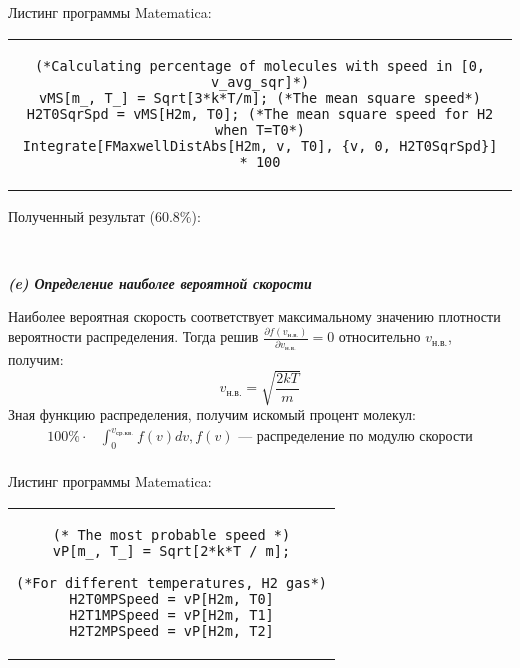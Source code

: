 Листинг программы Matematica:
\begin{center}
    \begin{tabular}{c}
    \begin{lstlisting}
(*Calculating percentage of molecules with speed in [0, v_avg_sqr]*)
vMS[m_, T_] = Sqrt[3*k*T/m]; (*The mean square speed*)
H2T0SqrSpd = vMS[H2m, T0]; (*The mean square speed for H2 when T=T0*)
Integrate[FMaxwellDistAbs[H2m, v, T0], {v, 0, H2T0SqrSpd}] * 100
    \end{lstlisting}
    \end{tabular}
\end{center}

Полученный результат (60.8\%):
\hspace{0pt}
\begin{figure}[H]
    \centering
    \begin{minipage}[h]{0.2\linewidth}
        \\
    \end{minipage}
\end{figure}


\textit{\textbf{(e) Определение наиболее вероятной скорости}}

Наиболее вероятная скорость соответствует максимальному значению плотности вероятности распределения.
Тогда решив $\frac{\partial f(v_{\text{н.в.}}) }{\partial v_{\text{н.в.}}} = 0$ относительно $v_{\text{н.в.}}$, получим:
\begin{equation*}
    v_{\text{н.в.}} = \sqrt{\frac{2kT}{m}}
\end{equation*}
Зная функцию распределения, получим искомый процент молекул:
\begin{equation*}
    \begin{aligned}
        100\% \cdot &\int_{0}^{v_{\text{ср.кв.}}} f(v)dv, f(v) \text{ --- распределение по модулю скорости}\\
    \end{aligned}
\end{equation*}

Листинг программы Matematica:
\begin{center}
    \begin{tabular}{c}
    \begin{lstlisting}
(* The most probable speed *)
vP[m_, T_] = Sqrt[2*k*T / m];

(*For different temperatures, H2 gas*)
H2T0MPSpeed = vP[H2m, T0]
H2T1MPSpeed = vP[H2m, T1]
H2T2MPSpeed = vP[H2m, T2]
    \end{lstlisting}
    \end{tabular}
\end{center}

